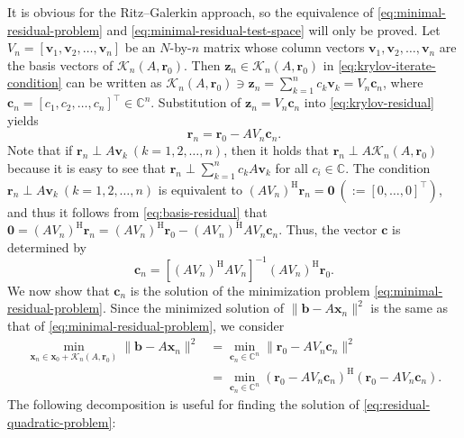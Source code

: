\begin{Proof}
It is obvious for the Ritz--Galerkin approach, so the equivalence of \eqref{eq:minimal-residual-problem} and \eqref{eq:minimal-residual-test-space} will only be proved. Let $V_n=[\bm v_1,\bm v_2,\ldots,\bm v_n]$ be an $N$-by-$n$ matrix whose column vectors $\bm v_1,\bm v_2,\ldots,\bm v_n$ are the basis vectors of $\mathcal K_n(A,\bm r_0)$. Then $\bm z_n\in\mathcal K_n(A,\bm r_0)$ in \eqref{eq:krylov-iterate-condition} can be written as $\mathcal K_n(A,\bm r_0)\ni\bm z_n=\sum_{k=1}^n c_k\bm v_k=V_n\bm c_n$, where $\bm c_n=[c_1,c_2,\ldots,c_n]^\top\in\mathbb C^n$. Substitution of $\bm z_n=V_n\bm c_n$ into \eqref{eq:krylov-residual} yields
\begin{equation}\label{eq:basis-residual}
\bm r_n=\bm r_0-AV_n\bm c_n.
\end{equation}
Note that if $\bm r_n\perp A\bm v_k\ (k=1,2,\ldots,n)$, then it holds that $\bm r_n\perp A\mathcal K_n(A,\bm r_0)$ because it is easy to see that $\bm r_n\perp\sum_{k=1}^n c_kA\bm v_k$ for all $c_i\in\mathbb C$. The condition $\bm r_n\perp A\bm v_k\ (k=1,2,\ldots,n)$ is equivalent to $(AV_n)^{\mathrm H}\bm r_n=\bm 0\ (:= [0,\ldots,0]^\top)$, and thus it follows from \eqref{eq:basis-residual} that $\bm 0=(AV_n)^{\mathrm H}\bm r_n=(AV_n)^{\mathrm H}\bm r_0-(AV_n)^{\mathrm H}AV_n\bm c_n$. Thus, the vector $\bm c$ is determined by
\begin{equation}\label{eq:normal-equation-coefficients}
\bm c_n=[(AV_n)^{\mathrm H}AV_n]^{-1}(AV_n)^{\mathrm H}\bm r_0.
\end{equation}
We now show that $\bm c_n$ is the solution of the minimization problem \eqref{eq:minimal-residual-problem}. Since the minimized solution of $\|\bm b-A\bm x_n\|^2$ is the same as that of \eqref{eq:minimal-residual-problem}, we consider
\begin{equation}\label{eq:residual-quadratic-problem}
\begin{aligned}
\min_{\bm x_n\in\bm x_0+\mathcal K_n(A,\bm r_0)}\|\bm b-A\bm x_n\|^2
&=\min_{\bm c_n\in\mathbb C^n}\|\bm r_0-AV_n\bm c_n\|^2\\
&=\min_{\bm c_n\in\mathbb C^n}(\bm r_0-AV_n\bm c_n)^{\mathrm H}(\bm r_0-AV_n\bm c_n).
\end{aligned}
\end{equation}
The following decomposition is useful for finding the solution of \eqref{eq:residual-quadratic-problem}:
\begin{equation}\label{eq:least-squares-decomposition}

\end{equation}
\end{Proof}
